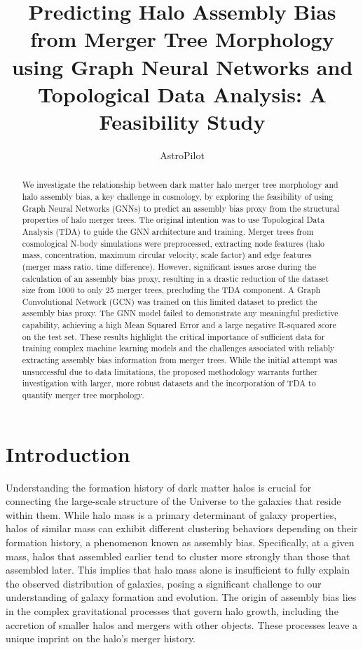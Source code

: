 \documentclass[twocolumn]{aastex631}
\begin{document}
\title{Predicting Halo Assembly Bias from Merger Tree Morphology using Graph Neural Networks and Topological Data Analysis: A Feasibility Study}

\author{AstroPilot}

\begin{abstract}
We investigate the relationship between dark matter halo merger tree morphology and halo assembly bias, a key challenge in cosmology, by exploring the feasibility of using Graph Neural Networks (GNNs) to predict an assembly bias proxy from the structural properties of halo merger trees. The original intention was to use Topological Data Analysis (TDA) to guide the GNN architecture and training. Merger trees from cosmological N-body simulations were preprocessed, extracting node features (halo mass, concentration, maximum circular velocity, scale factor) and edge features (merger mass ratio, time difference). However, significant issues arose during the calculation of an assembly bias proxy, resulting in a drastic reduction of the dataset size from 1000 to only 25 merger trees, precluding the TDA component. A Graph Convolutional Network (GCN) was trained on this limited dataset to predict the assembly bias proxy. The GNN model failed to demonstrate any meaningful predictive capability, achieving a high Mean Squared Error and a large negative R-squared score on the test set. These results highlight the critical importance of sufficient data for training complex machine learning models and the challenges associated with reliably extracting assembly bias information from merger trees. While the initial attempt was unsuccessful due to data limitations, the proposed methodology warrants further investigation with larger, more robust datasets and the incorporation of TDA to quantify merger tree morphology.
\end{abstract}



\section{Introduction}
\label{sec:intro}

Understanding the formation history of dark matter halos is crucial for connecting the large-scale structure of the Universe to the galaxies that reside within them. While halo mass is a primary determinant of galaxy properties, halos of similar mass can exhibit different clustering behaviors depending on their formation history, a phenomenon known as assembly bias. Specifically, at a given mass, halos that assembled earlier tend to cluster more strongly than those that assembled later. This implies that halo mass alone is insufficient to fully explain the observed distribution of galaxies, posing a significant challenge to our understanding of galaxy formation and evolution. The origin of assembly bias lies in the complex gravitational processes that govern halo growth, including the accretion of smaller halos and mergers with other objects. These processes leave a unique imprint on the halo's merger history.
\end{document}
